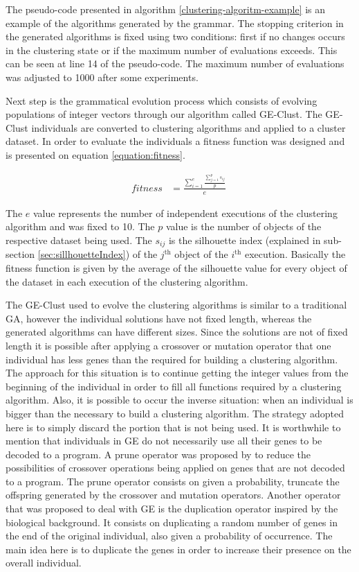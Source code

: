 \documentclass[journal]{IEEEtran}
\begin{document}
	The pseudo-code presented in algorithm \ref{clustering-algoritm-example} is an example of the algorithms generated by the grammar. The stopping criterion in the generated algorithms is fixed using two conditions: first if no changes occurs in the clustering state or if the maximum number of evaluations exceeds. This can be seen at line 14 of the pseudo-code. The maximum number of evaluations was adjusted to 1000 after some experiments.
	
	Next step is the grammatical evolution process which consists of evolving populations of integer vectors through our algorithm called GE-Clust. The GE-Clust individuals are converted to clustering algorithms and applied to a cluster dataset. In order to evaluate the individuals a fitness function was designed and is presented on equation \ref{equation:fitness}.
	
	\begin{align}
	\label{equation:fitness}
	fitness    &= \frac{\sum_{i=1}^e \frac{\sum_{j=1}^{p} s_{ij}}{p}}{e}
	\
	\end{align}
	
	The $e$ value represents the number of independent executions of the clustering algorithm and was fixed to 10. The $p$ value is the number of objects of the respective dataset being used. The $s_{ij}$ is the silhouette index (explained in sub-section \ref{sec:sillhouetteIndex}) of the $j^{\text{th}}$ object of the $i^{\text{th}}$ execution. Basically the fitness function is given by the average of the silhouette value for every object of the dataset in each execution of the clustering algorithm.
	
	The GE-Clust used to evolve the clustering algorithms is similar to a traditional GA, however the individual solutions have not fixed length, whereas the generated algorithms can have different sizes. Since the solutions are not of fixed length it is possible after applying a crossover or mutation operator that one individual has less genes than the required for building a clustering algorithm. The approach for this situation is to continue getting the integer values from the beginning of the individual in order to fill all functions required by a clustering algorithm. Also, it is possible to occur the inverse situation: when an individual is bigger than the necessary to build a clustering algorithm. The strategy adopted here is to simply discard the portion that is not being used. It is worthwhile to mention that individuals in GE do not necessarily use all their genes to be decoded to a program. A prune operator was proposed by \cite{ryan1998grammatical} to reduce the possibilities of crossover operations being applied on genes that are not decoded to a program. The prune operator consists on given a probability, truncate the offspring generated by the crossover and mutation operators. Another operator that was proposed to deal with GE is the duplication operator inspired by the biological background. It consists on duplicating a random number of genes in the end of the original individual, also given a probability of occurrence. The main idea here is to duplicate the genes in order to increase their presence on the overall individual.
	
\end{document}
